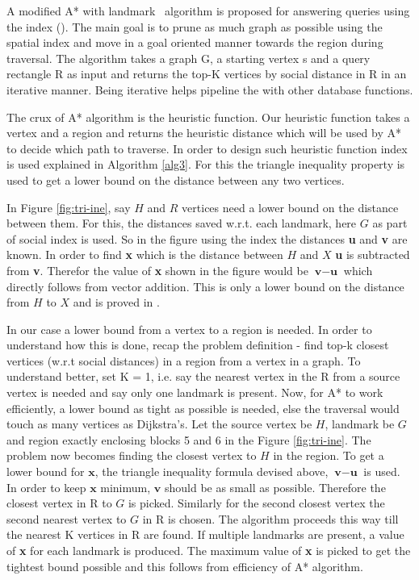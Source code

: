 A modified A* with landmark~\cite{AC2005} algorithm is proposed for answering {\query} queries using the {\grp} index ({\rrp}). The main goal is to prune as much graph as possible using the spatial index and move in a goal oriented manner towards the region during traversal. The algorithm takes a graph G, a starting vertex s and a query rectangle R as input and returns the top-K vertices by social distance in R in an iterative manner. Being iterative helps pipeline the {\rrp} with other database functions.

The crux of A* algorithm is the heuristic function. Our heuristic function takes a vertex and a region and returns the heuristic distance which will be used by A* to decide which path to traverse. In order to design such heuristic function {\rrpsocial} index is used explained in Algorithm \ref{alg3}. For this the triangle inequality property is used to get a lower bound on the distance between any two vertices.

In Figure \ref{fig:tri-ine}, say $H$ and $R$ vertices need a lower bound on the distance between them. For this, the distances saved w.r.t. each landmark, here $G$ as part of social {\rrp} index is used. So in the figure using the index the distances \textbf{u} and \textbf{v} are known. In order to find \textbf{x} which is the distance between $H$ and $X$ \textbf{u} is subtracted from \textbf{v}. Therefor the value of \textbf{x} shown in the figure would be $\textbf{v} - \textbf{u}$ which directly follows from vector addition. This is only a lower bound on the distance from $H$ to $X$ and is proved in \cite{AC2005}.

In our case a lower bound from a vertex to a region is needed. In order to understand how this is done, recap the problem definition - find top-k closest vertices (w.r.t social distances) in a region from a vertex in a graph. To understand better, set K = 1, i.e. say the nearest vertex in the R from a source vertex is needed and say only one landmark is present. Now, for A* to work efficiently, a lower bound as tight as possible is needed, else the traversal would touch as many vertices as Dijkstra's. Let the source vertex be $H$, landmark be $G$ and region exactly enclosing blocks 5 and 6 in the Figure \ref{fig:tri-ine}. The problem now becomes finding the closest vertex to $H$ in the region. To get a lower bound for $\textbf{x}$, the triangle inequality formula devised above, $\textbf{v} - \textbf{u}$ is used. In order to keep $\textbf{x}$ minimum, $\textbf{v}$ should be as small as possible. Therefore the closest vertex in R to $G$ is picked. Similarly for the second closest vertex the second nearest vertex to $G$ in R is chosen. The algorithm proceeds this way till the nearest K vertices in R are found. If multiple landmarks are present, a value of \textbf{x} for each landmark is produced. The maximum value of \textbf{x} is picked to get the tightest bound possible and this follows from efficiency of A* algorithm.

